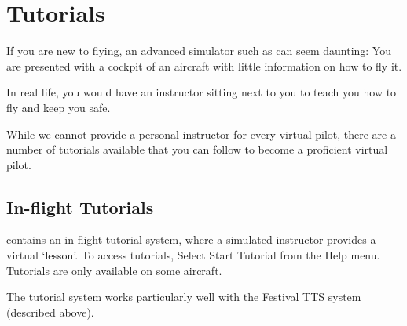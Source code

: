 
\chapter{Tutorials\label{tutorials}}

If you are new to flying, an advanced simulator such as \FlightGear{} can seem
daunting: You are presented with a cockpit of an aircraft with little 
information on how to fly it.

In real life, you would have an instructor sitting next to you to teach you how 
to fly and keep you safe.

While we cannot provide a personal instructor for every virtual pilot, there are
a number of tutorials available that you can follow to become a proficient
virtual pilot.

\section{In-flight Tutorials}

\FlightGear{} contains an in-flight tutorial system, where a simulated 
instructor provides a virtual `lesson'. To access tutorials, Select Start 
Tutorial from the Help menu. Tutorials are only available on some aircraft.

The tutorial system works particularly well with the Festival TTS system 
(described above).

